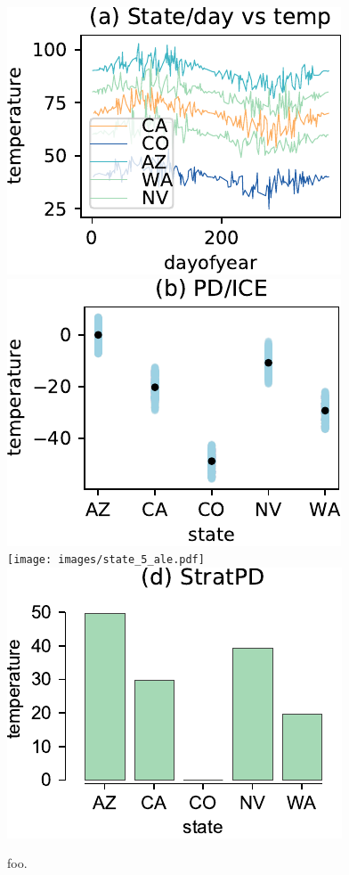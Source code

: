 \documentclass{article}
\begin{document}
\begin{figure}[htbp]
\begin{center}
\includegraphics[scale=0.45]{images/dayofyear_vs_temp.pdf}~~
\includegraphics[scale=0.45]{images/state_vs_temp_pdp.pdf}~~
\texttt{[image: images/state\_5\_ale.pdf]}~~
\includegraphics[scale=0.45]{images/state_vs_temp_stratpd.pdf}~~
\caption{\small foo.}
\label{fig:statetemp}
\end{center}
\end{figure}
\end{document}
